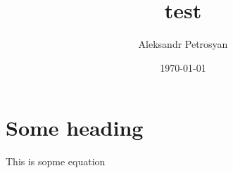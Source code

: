 \documentclass[11pt]{article}
\author{Aleksandr Petrosyan}
\date{\today}
\title{test}
\begin{document}
\maketitle
\tableofcontents

\section{}
\label{sec-1}
\section{}
\label{sec-2}
\section{}
\label{sec-3}
\section{}
\label{sec-4}
\section{}
\label{sec-5}
\section{Some heading}
\label{sec-6}


This is sopme equation 
\end{document}
